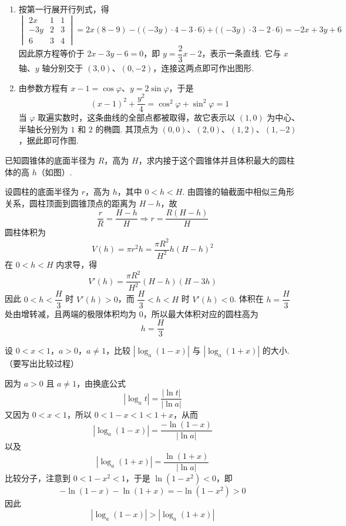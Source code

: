 \documentclass[UTF8,a4paper,oneside,11pt]{ctexbook}
\begin{document}
\begin{solution}
\begin{enumerate}
\item 按第一行展开行列式，得
\[
\begin{vmatrix} 2x & 1 & 1 \\ -3y & 2 & 3 \\ 6 & 3 & 4 \end{vmatrix}
=2x(8-9)-\bigl((-3y)\cdot4-3\cdot6\bigr)+\bigl((-3y)\cdot3-2\cdot6\bigr)
=-2x+3y+6
\]
因此原方程等价于 \(2x-3y-6=0\)，即 \(y=\dfrac{2}{3}x-2\)，表示一条直线. 它与 \(x\) 轴、\(y\) 轴分别交于 \((3,0)\)、\((0,-2)\)，连接这两点即可作出图形.
\item 由参数方程有 \(x-1=\cos\varphi\)、\(y=2\sin\varphi\)，于是
\[
\left(x-1\right)^2+\dfrac{y^2}{4}=\cos^2\varphi+\sin^2\varphi=1
\]
当 \(\varphi\) 取遍实数时，这条曲线的全部点都被取得，故它表示以 \((1,0)\) 为中心、半轴长分别为 \(1\) 和 \(2\) 的椭圆. 其顶点为 \((0,0)\)、\((2,0)\)、\((1,2)\)、\((1,-2)\)，据此即可作图.
\end{enumerate}
\end{solution}

\begin{problem}

已知圆锥体的底面半径为 \(R\)，高为 \(H\)，求内接于这个圆锥体并且体积最大的圆柱体的高 \(h\)（如图）.

\FloatBarrier
\end{problem}

\begin{solution}
设圆柱的底面半径为 \(r\)，高为 \(h\)，其中 \(0<h<H\). 由圆锥的轴截面中相似三角形关系，圆柱顶面到圆锥顶点的距离为 \(H-h\)，故
\[
\dfrac{r}{R}=\dfrac{H-h}{H}\Longrightarrow r=\dfrac{R(H-h)}{H}
\]
圆柱体积为
\[
V(h)=\pi r^2h=\dfrac{\pi R^2}{H^2}h(H-h)^2
\]
在 \(0<h<H\) 内求导，得
\[
V'(h)=\dfrac{\pi R^2}{H^2}(H-h)(H-3h)
\]
因此 \(0<h<\dfrac{H}{3}\) 时 \(V'(h)>0\)，而 \(\dfrac{H}{3}<h<H\) 时 \(V'(h)<0\). 体积在 \(h=\dfrac{H}{3}\) 处由增转减，且两端的极限体积均为 \(0\)，所以最大体积对应的圆柱高为
\[
h=\dfrac{H}{3}
\]
\end{solution}

\begin{problem}

设 \(0<x<1\)，\(a>0\)，\(a\neq 1\)，比较 \(\left|\log_a(1-x)\right|\) 与 \(\left|\log_a(1+x)\right|\) 的大小. （要写出比较过程）
\end{problem}

\begin{solution}
因为 \(a>0\) 且 \(a\neq1\)，由换底公式
\[
\left|\log_a t\right|=\dfrac{|\ln t|}{|\ln a|}
\]
又因为 \(0<x<1\)，所以 \(0<1-x<1<1+x\)，从而
\[
\left|\log_a(1-x)\right|=\dfrac{-\ln(1-x)}{|\ln a|}
\]
以及
\[
\left|\log_a(1+x)\right|=\dfrac{\ln(1+x)}{|\ln a|}
\]
比较分子，注意到 \(0<1-x^2<1\)，于是 \(\ln(1-x^2)<0\)，即
\[
-\ln(1-x)-\ln(1+x)=-\ln(1-x^2)>0
\]
因此
\[
\left|\log_a(1-x)\right|>\left|\log_a(1+x)\right|
\]
\end{solution}
\end{document}
